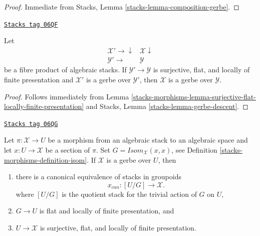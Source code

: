\begin{proof}
Immediate from
Stacks, Lemma \ref{stacks-lemma-composition-gerbe}.
\end{proof}

\begin{lemma}
\label{stacks-morphisms-lemma-gerbe-descent}
\href{https://stacks.math.columbia.edu/tag/06QF}{\texttt{Stacks tag 06QF}}

Let
$$
\begin{array}{cc}\mathcal{X}' \longrightarrow\downarrow & \mathcal{X} \downarrow \\ \mathcal{Y}' \longrightarrow & \mathcal{Y}\end{array}
$$
be a fibre product of algebraic stacks.
If $\mathcal{Y}' \to \mathcal{Y}$ is surjective, flat, and locally
of finite presentation and $\mathcal{X}'$ is a gerbe over $\mathcal{Y}'$,
then $\mathcal{X}$ is a gerbe over $\mathcal{Y}$.
\end{lemma}

\begin{proof}
Follows immediately from
Lemma \ref{stacks-morphisms-lemma-surjective-flat-locally-finite-presentation}
and
Stacks, Lemma \ref{stacks-lemma-gerbe-descent}.
\end{proof}

\begin{lemma}
\label{stacks-morphisms-lemma-gerbe-with-section}
\href{https://stacks.math.columbia.edu/tag/06QG}{\texttt{Stacks tag 06QG}}

Let $\pi : \mathcal{X} \to U$ be a morphism from an algebraic stack to
an algebraic space and let $x : U \to \mathcal{X}$ be a section of $\pi$.
Set $G = \mathit{Isom}_\mathcal{X}(x, x)$, see
Definition \ref{stacks-morphisms-definition-isom}.
If $\mathcal{X}$ is a gerbe over $U$, then
\begin{enumerate}
\item there is a canonical equivalence of stacks in groupoids
$$
x_{can} : [U/G] \longrightarrow \mathcal{X}.
$$
where $[U/G]$ is the quotient stack for the trivial
action of $G$ on $U$,
\item $G \to U$ is flat and locally of finite presentation, and
\item $U \to \mathcal{X}$ is surjective, flat, and locally of finite
presentation.
\end{enumerate}
\end{lemma}

